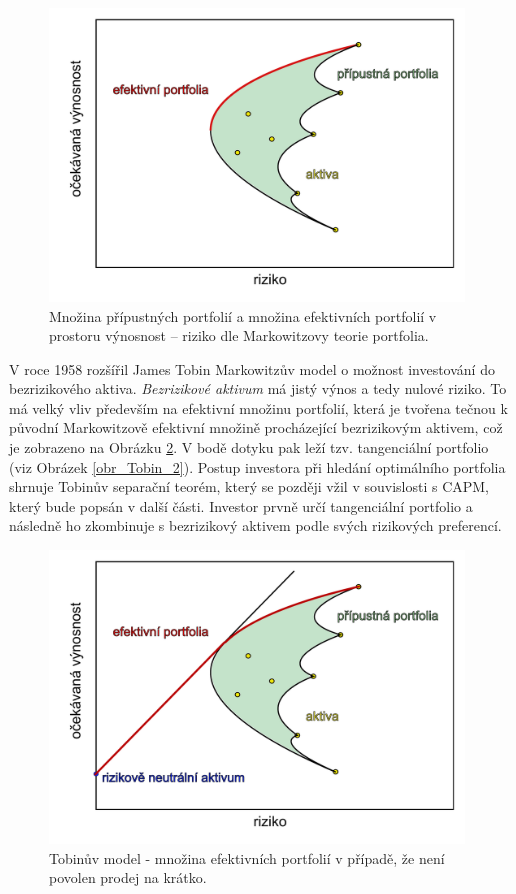 \documentclass[a4paper,12pt]{report}
\theoremstyle{definition} \newtheorem{definice}[veta]{Definice}
\theoremstyle{remark}
\begin{document}
\begin{figure}[!htbp] 
  \centering 
  \includegraphics[width=11cm]{IMG/graf_2a.pdf}
  \caption{Množina přípustných portfolií  a množina efektivních portfolií v prostoru výnosnost -- riziko dle Markowitzovy teorie portfolia.} 
  \label{obr_Markowitz}
\end{figure}

V roce 1958 rozšířil James Tobin \cite{tobin} Markowitzův model o možnost investování do bezrizikového aktiva.
\textit{Bezrizikové aktivum} má jistý výnos a tedy nulové riziko.
To má velký vliv především na efektivní množinu portfolií, která je tvořena tečnou k původní Markowitzově efektivní množině procházející bezrizikovým aktivem, což je zobrazeno na Obrázku \ref{obr_Tobin_1}.
V bodě dotyku pak leží tzv. tangenciální portfolio (viz Obrázek \ref{obr_Tobin_2}).
Postup investora při hledání optimálního portfolia shrnuje Tobinův separační teorém, který se později vžil v souvislosti s CAPM, který bude popsán v další části. %
Investor prvně určí tangenciální portfolio a následně ho zkombinuje s bezrizikový aktivem podle svých rizikových preferencí.

\begin{figure}[!htbp]
  \centering 
  \includegraphics[width=11cm]{IMG/graf_5b.pdf}
  \caption{Tobinův model - množina efektivních portfolií v případě, že není povolen prodej na krátko.}
  \label{obr_Tobin_1}
\end{figure}
\end{document}
